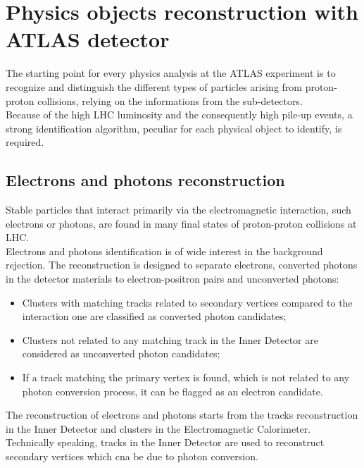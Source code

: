 \chapter{Physics objects reconstruction with ATLAS detector}
\label{capitolo_4}
The starting point for every physics analysis at the ATLAS experiment is to recognize and distinguish the different types of particles arising from proton-proton collisions, relying on the informations from the sub-detectors.
\\
Because of the high LHC luminosity and the consequently high pile-up events, a strong identification algorithm, peculiar for each physical object to identify, is required.

\section{Electrons and photons reconstruction}
Stable particles that interact primarily via the electromagnetic interaction, such electrons or photons, are found in many final states of proton-proton collisions at LHC.
\\
Electrons and photons identification \cite{ATL-PHYS-PUB-2011-006, ATL-PHYS-PUB-2011-007} is of wide interest in the background rejection. The reconstruction is designed to separate electrons, converted photons in the detector materials to electron-positron pairs and unconverted photons:
\begin{itemize}
\item Clusters with matching tracks related to secondary vertices compared to the interaction one are classified as converted photon candidates;
\item Clusters not related to any matching track in the Inner Detector are considered as unconverted photon candidates;
\item If a track matching the primary vertex is found, which is not related to any photon conversion process, it can be flagged as an electron candidate.
\end{itemize}
The reconstruction of electrons and photons starts from the tracks reconstruction in the Inner Detector and clusters in the Electromagnetic Calorimeter. Technically speaking, tracks in the Inner Detector are used to reconstruct secondary vertices which cna be due to photon conversion.

